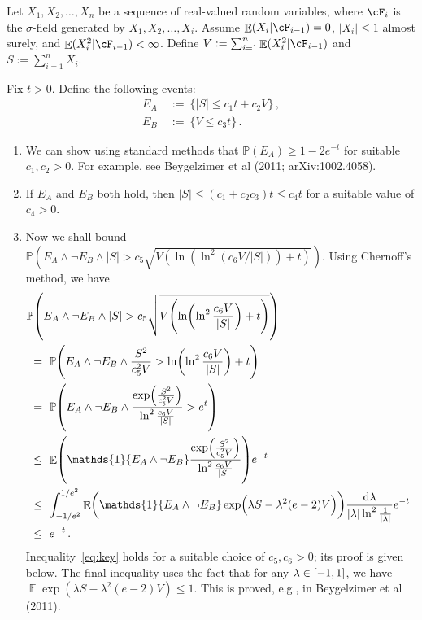 \documentclass[11pt]{article}
\DeclareMathOperator{\E}{\mathbb{E}}
\renewcommand{\P}{\ensuremath{\mathbb{P}}}
\theoremstyle{remark}
\theoremstyle{definition}
\newcommand\braces[1]{\{#1\}}
\renewcommand\abs[1]{|#1|} %
\newcommand\ind[1]{\ensuremath{\mathds{1}\{#1\}}}
\newcommand\Parens[1]{\mleft(#1\mright)}
\begin{document}
Let $X_1, X_2, \dotsc, X_n$ be a sequence of real-valued random
variables, where $\cF_i$ is the $\sigma$-field generated by $X_1, X_2,
\dotsc, X_i$.
Assume $\E(X_i|\cF_{i-1}) = 0$, $\abs{X_i} \leq 1$ almost surely, and
$\E(X_i^2|\cF_{i-1}) < \infty$.
Define $V := \sum_{i=1}^n \E(X_i^2|\cF_{i-1})$ and $S := \sum_{i=1}^n
X_i$.

Fix $t>0$.
Define the following events:
\begin{align*}
  E_A & \ := \ \braces{ |S| \leq c_1 t + c_2 V }
  \,, \\
  E_B & \ := \ \braces{ V \leq c_3 t }
  \,.
\end{align*}
\begin{enumerate}
  \item
    We can show using standard methods that $\P(E_A) \geq 1-2e^{-t}$
    for suitable $c_1, c_2 > 0$.
    For example, see Beygelzimer et al (2011; arXiv:1002.4058).

  \item
    If $E_A$ and $E_B$ both hold, then $|S| \leq (c_1 + c_2c_3) t \leq
    c_4 t$ for a suitable value of $c_4 > 0$.

  \item
    Now we shall bound $\P(E_A \wedge \neg E_B \wedge |S| > c_5
    \sqrt{V (\ln(\ln^2(c_6V/|S|)) + t)})$.
    Using Chernoff's method, we have
    \begin{align}
      \lefteqn{
        \P\Parens{
          E_A \wedge \neg E_B \wedge
          |S| > c_5 \sqrt{
            V \Parens{
              \ln\Parens{
                \ln^2\frac{c_6V}{|S|}
              } + t
            }
          }
        }
      }
      \notag \\
      & \ = \
      \P\Parens{
        E_A \wedge \neg E_B \wedge
        \frac{S^2}{c_5^2V}
        > \ln\Parens{\ln^2\frac{c_6V}{|S|}} + t
      }
      \notag \\
      & \ = \
      \P\Parens{
        E_A \wedge \neg E_B \wedge
        \frac{
          \exp\Parens{\frac{S^2}{c_5^2V}}
        }{
          \ln^2\frac{c_6V}{|S|}
        }
        > e^t
      }
      \notag \\
      & \ \leq \
      \E\Parens{
        \ind{E_A \wedge \neg E_B}
        \frac{
          \exp\Parens{\frac{S^2}{c_5^2V}}
        }{
          \ln^2\frac{c_6V}{|S|}
        }
      }
      e^{-t}
      \notag \\
      & \ \leq \
      \int_{-1/e^2}^{1/e^2}
      \E\Parens{
        \ind{E_A \wedge \neg E_B}
        \exp\Parens{ \lambda S - \lambda^2 (e-2) V }
      }
      \frac{\dif\lambda}{\abs{\lambda}\ln^2\frac1{\abs{\lambda}}}
      e^{-t}
      \label{eq:key} \\
      & \ \leq \
      e^{-t}
      \,.
    \end{align}
    Inequality~\eqref{eq:key} holds for a suitable choice of
    $c_5, c_6 > 0$; its proof is given below.
    The final inequality uses the fact that for any $\lambda \in
    \intcc{-1,1}$, we have $\E\exp(\lambda S - \lambda^2 (e-2) V) \leq
    1$.
    This is proved, e.g., in Beygelzimer et al (2011).


\end{enumerate}
\end{document}
